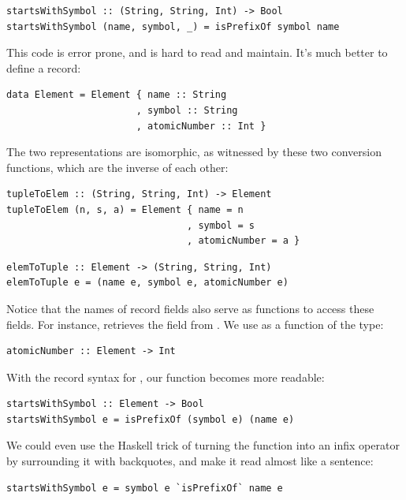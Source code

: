 \begin{verbatim}
startsWithSymbol :: (String, String, Int) -> Bool
startsWithSymbol (name, symbol, _) = isPrefixOf symbol name
\end{verbatim}

\noindent
This code is error prone, and is hard to read and maintain. It's much
better to define a record:

\begin{verbatim}
data Element = Element { name :: String 
                       , symbol :: String 
                       , atomicNumber :: Int }
\end{verbatim}

\noindent
The two representations are isomorphic, as witnessed by these two
conversion functions, which are the inverse of each other:

\begin{verbatim}
tupleToElem :: (String, String, Int) -> Element
tupleToElem (n, s, a) = Element { name = n 
                                , symbol = s 
                                , atomicNumber = a }
\end{verbatim}

\begin{verbatim}
elemToTuple :: Element -> (String, String, Int)
elemToTuple e = (name e, symbol e, atomicNumber e)
\end{verbatim}

\noindent
Notice that the names of record fields also serve as functions to access
these fields. For instance,  retrieves the
 field from . We use
 as a function of the type:

\begin{verbatim}
atomicNumber :: Element -> Int
\end{verbatim}

With the record syntax for , our function
 becomes more readable:

\begin{verbatim}
startsWithSymbol :: Element -> Bool
startsWithSymbol e = isPrefixOf (symbol e) (name e)
\end{verbatim}

\noindent
We could even use the Haskell trick of turning the function
 into an infix operator by surrounding it with
backquotes, and make it read almost like a sentence:

\begin{verbatim}
startsWithSymbol e = symbol e `isPrefixOf` name e
\end{verbatim}

